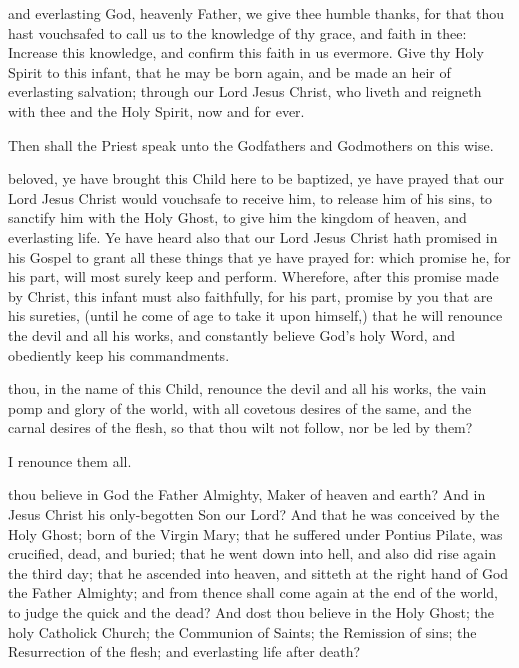  and everlasting God, heavenly Father, we give thee humble thanks, for that thou hast vouchsafed to call us to the knowledge of thy grace, and faith in thee: Increase this knowledge, and confirm this faith in us evermore.
Give thy Holy Spirit to this infant, that he may be born again, and be made an heir of everlasting salvation; through our Lord Jesus Christ, who liveth and reigneth with thee and the Holy Spirit, now and for ever.

\begin{rubric}
Then shall the Priest speak unto the Godfathers and Godmothers on this wise.
\end{rubric}

 beloved, ye have brought this Child here to be baptized, ye have prayed that our Lord Jesus Christ would vouchsafe to receive him, to release him of his sins, to sanctify him with the Holy Ghost, to give him the kingdom of heaven, and everlasting life.
Ye have heard also that our Lord Jesus Christ hath promised in his Gospel to grant all these things that ye have prayed for: which promise he, for his part, will most surely keep and perform.
Wherefore, after this promise made by Christ, this infant must also faithfully, for his part, promise by you that are his sureties, (until he come of age to take it upon himself,) that he will renounce the devil and all his works, and constantly believe God's holy Word, and obediently keep his commandments.
\\


 thou, in the name of this Child, renounce the devil and all his works, the vain pomp and glory of the world, with all covetous desires of the same, and the carnal desires of the flesh, so that thou wilt not follow, nor be led by them?

 I renounce them all.

 thou believe in God the Father Almighty, Maker of heaven and earth?
And in Jesus Christ his only-begotten Son our Lord?
And that he was conceived by the Holy Ghost; born of the Virgin Mary; that he suffered under Pontius Pilate, was crucified, dead, and buried; that he went down into hell, and also did rise again the third day; that he ascended into heaven, and sitteth at the right hand of God the Father Almighty; and from thence shall come again at the end of the world, to judge the quick and the dead?
And dost thou believe in the Holy Ghost; the holy Catholick Church; the Communion of Saints; the Remission of sins; the Resurrection of the flesh; and everlasting life after death?

